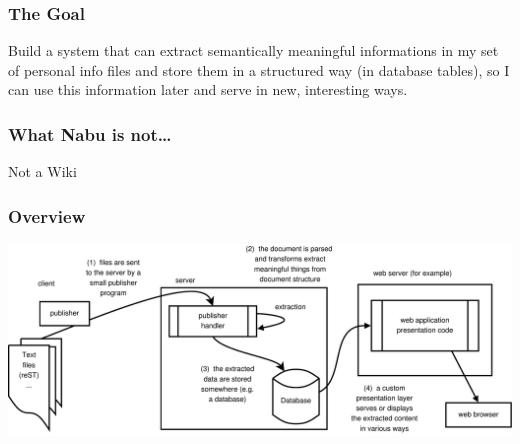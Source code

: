 \documentclass[compress,trans]{beamer}
\begin{document}
\begin{frame}[fragile]
  \frametitle{The Goal}

  Build a system that can extract semantically meaningful informations in my set
  of personal info files and store them in a structured way (in database
  tables), so I can use this information later and serve in new, interesting
  ways.

\end{frame}



\begin{frame}[fragile]
  \frametitle{What Nabu is not\dots}

Not a Wiki



\end{frame}



\begin{frame}[fragile]
  \frametitle{Overview}

\includegraphics[width=1.0\textwidth]{../nabu2.pdf}

\end{frame}
\end{document}
